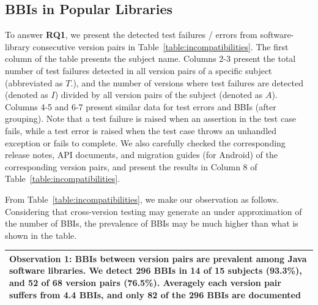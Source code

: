 
\subsection{BBIs in Popular Libraries}
\label{subsubsec:prevIncomp}

To answer \textbf{RQ1}, we present the detected test failures / errors from software-library consecutive version pairs in Table~\ref{table:incompatibilities}. The first column of the table presents the subject name. Columns 2-3 present the total number of test failures detected in all version pairs of a specific subject (abbreviated as $T.$), and the number of versions where test failures are detected (denoted as $I$) divided by all version pairs of the subject (denoted as $A$). Columns 4-5 and 6-7 present similar data for test errors and BBIs (after grouping). Note that a test failure is raised when an assertion in the test case fails, while a test error is raised when the test case throws an unhandled exception or fails to complete. We also carefully checked the corresponding release notes, API documents, and migration guides (for Android) of the corresponding version pairs, and present the results in Column 8 of Table~\ref{table:incompatibilities}.



From Table~\ref{table:incompatibilities}, we make our observation as follows. Considering that cross-version testing may generate an under approximation of the number of BBIs, the prevalence of BBIs may be much higher than what is shown in the table.


\medskip\vspace{+0.05cm}
\noindent\begin{tabular}{|p{16cm}|}
	\hline
	\textbf{Observation 1:} BBIs between version pairs are prevalent among Java software libraries. We detect 296 BBIs in 14 of 15 subjects (93.3\%), and 52 of 68 version pairs (76.5\%). Averagely each version pair suffers from 4.4 BBIs, and only 82 of the 296 BBIs are documented\\
	\hline
\end{tabular}
\medskip\vspace{+0.2cm}





